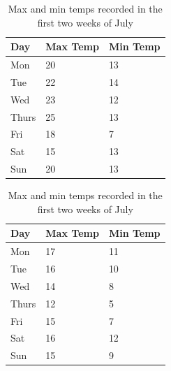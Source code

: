 \begin{table}[htb]
	\begin{subtable}[h]{0.45\textwidth}
		\centering
		\begin{tabular}{l | l | l}
			Day   & Max Temp & Min Temp \\
			\hline \hline
			Mon   & 20       & 13       \\
			Tue   & 22       & 14       \\
			Wed   & 23       & 12       \\
			Thurs & 25       & 13       \\
			Fri   & 18       & 7        \\
			Sat   & 15       & 13       \\
			Sun   & 20       & 13       
		\end{tabular}
		\caption{First Week}
		\label{tab:week1}
	\end{subtable}
	\hfill
	\begin{subtable}[h]{0.45\textwidth}
		\centering
		\begin{tabular}{l | l | l}
			Day   & Max Temp & Min Temp \\
			\hline \hline
			Mon   & 17       & 11       \\
			Tue   & 16       & 10       \\
			Wed   & 14       & 8        \\
			Thurs & 12       & 5        \\
			Fri   & 15       & 7        \\
			Sat   & 16       & 12       \\
			Sun   & 15       & 9        
		\end{tabular}
		\caption{Second Week}
		\label{tab:week2}
	\end{subtable}
	\caption{Max and min temps recorded in the first two weeks of July}
	\label{tab:temps}
\end{table}
\clearpage